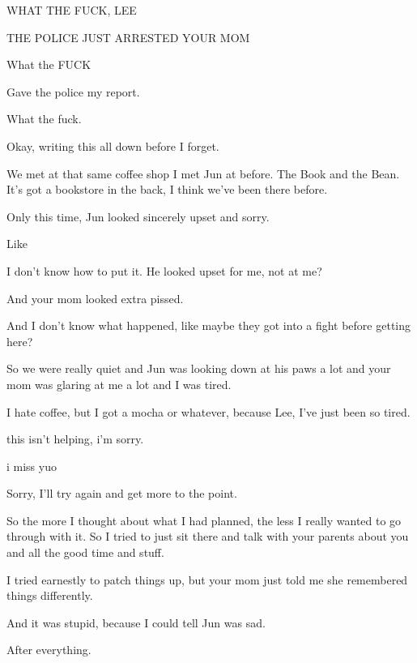 {
WHAT THE FUCK, LEE

THE POLICE JUST ARRESTED YOUR MOM

What the FUCK

Gave the police my report.

What the fuck.

Okay, writing this all down before I
forget.

We met at that same coffee shop I
met Jun at before. The Book and the Bean. It's got a bookstore in the
back, I think we've been there before.

Only this time, Jun looked sincerely
upset and sorry.

Like

I don't know how to put it. He
looked upset for me, not at me?

And your mom looked extra pissed.

And I don't know what happened, like
maybe they got into a fight before getting here?

So we were really quiet and Jun was
looking down at his paws a lot and your mom was glaring at me a lot and
I was tired.

I hate coffee, but I got a mocha or
whatever, because Lee, I've just been so tired.

this isn't helping, i'm sorry.

i miss yuo

Sorry, I'll try again and get more
to the point.

So the more I thought about what I
had planned, the less I really wanted to go through with it. So I tried
to just sit there and talk with your parents about you and all the good
time and stuff.

I tried earnestly to patch things
up, but your mom just told me she remembered things differently.

And it was stupid, because I could
tell Jun was sad.

After everything.

}
